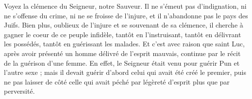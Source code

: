 Voyez la clémence du Seigneur, notre Sauveur. Il ne s’émeut pas d’indignation, ni ne s’offense du crime, ni ne se froisse de l’injure, et il n’abandonne pas le pays des Juifs. Bien plus, oublieux de l’injure et se souvenant de sa clémence, il cherche à gagner le coeur de ce peuple infidèle, tantôt en l’instruisant, tantôt en délivrant les possédés, tantôt en guérissant les malades. Et c’est avec raison que saint Luc, après avoir présenté un homme délivré de l’esprit mauvais, continue par le récit de la guérison d’une femme. En effet, le Seigneur était venu pour guérir Pun et l’autre sexe ; mais il devait guérir d’abord celui qui avait été créé le premier, puis ne pas laisser de côté celle qui avait péché par légèreté d’esprit plus que par perversité.
